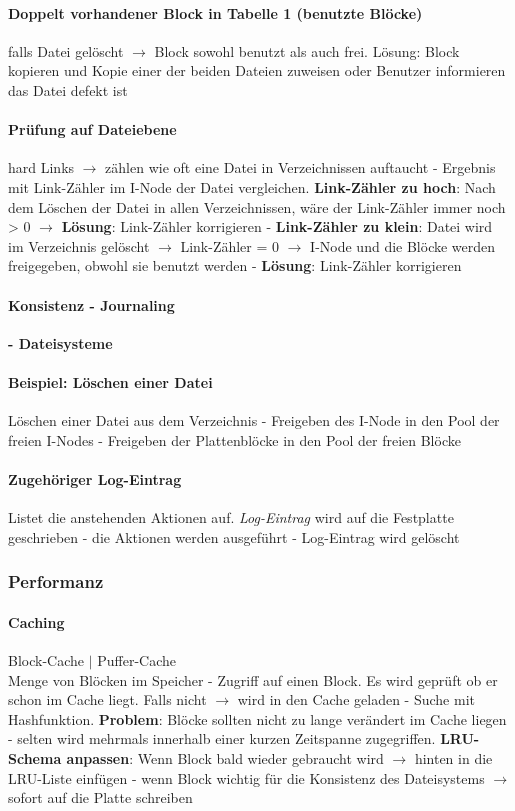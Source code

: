 \documentclass[10pt,a4paper,landscape]{article}
\begin{document}
\begin{multicols*}{3}
	\paragraph{Doppelt vorhandener Block in Tabelle 1 (benutzte Blöcke)} falls Datei gelöscht $\rightarrow$ Block sowohl benutzt als auch frei. Lösung: Block kopieren und Kopie einer der beiden Dateien zuweisen oder Benutzer informieren das Datei defekt ist
	\paragraph{Prüfung auf Dateiebene} hard Links $\rightarrow$ zählen wie oft eine Datei in Verzeichnissen auftaucht - Ergebnis mit Link-Zähler im I-Node der Datei vergleichen. \textbf{Link-Zähler zu hoch}: Nach dem Löschen der Datei in allen Verzeichnissen, wäre der Link-Zähler immer noch > 0 $\rightarrow$ \textbf{Lösung}: Link-Zähler korrigieren - \textbf{Link-Zähler zu klein}: Datei wird im Verzeichnis gelöscht $\rightarrow$ Link-Zähler = 0 $\rightarrow$ I-Node und die Blöcke werden freigegeben, obwohl sie benutzt werden - \textbf{Lösung}: Link-Zähler korrigieren
	\paragraph{Konsistenz - Journaling} \textbf{- Dateisysteme}
	\paragraph{Beispiel: Löschen einer Datei} Löschen einer Datei aus dem Verzeichnis - Freigeben des I-Node in den Pool der freien I-Nodes - Freigeben der Plattenblöcke in den Pool der freien Blöcke
	\paragraph{Zugehöriger Log-Eintrag} Listet die anstehenden Aktionen auf. \textit{Log-Eintrag} wird auf die Festplatte geschrieben - die Aktionen werden ausgeführt - Log-Eintrag wird gelöscht
	\subsubsection{Performanz}
	\paragraph{Caching} Block-Cache $\vert$ Puffer-Cache\\
	Menge von Blöcken im Speicher - Zugriff auf einen Block. Es wird geprüft ob er schon im Cache liegt. Falls nicht $\rightarrow$ wird in den Cache geladen - Suche mit Hashfunktion. \textbf{Problem}: Blöcke sollten nicht zu lange verändert im Cache liegen - selten wird mehrmals innerhalb einer kurzen Zeitspanne zugegriffen. \textbf{LRU-Schema anpassen}: Wenn Block bald wieder gebraucht wird $\rightarrow$ hinten in die LRU-Liste einfügen - wenn Block wichtig für die Konsistenz des Dateisystems $\rightarrow$ sofort auf die Platte schreiben

\end{multicols*}
\end{document}
